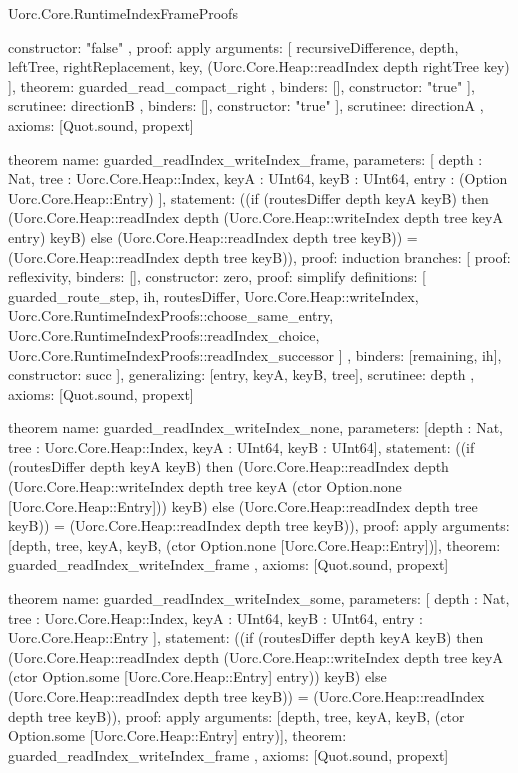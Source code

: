 \begin{lexlean}{Uorc.Core.RuntimeIndexFrameProofs}
\begin{semanticmodule}
{{{{{              constructor: "false"
            },
            {
              proof: apply{
                arguments: [
                  recursiveDifference,
                  depth,
                  leftTree,
                  rightReplacement,
                  key,
                  (Uorc.Core.Heap::readIndex depth rightTree key)
                ],
                theorem: guarded_read_compact_right
              },
              binders: [],
              constructor: "true"
            }
          ],
          scrutinee: directionB
        },
        binders: [],
        constructor: "true"
      }
    ],
    scrutinee: directionA
  },
  axioms: [Quot.sound, propext]
}

theorem{
  name: guarded_readIndex_writeIndex_frame,
  parameters: [
    depth : Nat,
    tree : Uorc.Core.Heap::Index,
    keyA : UInt64,
    keyB : UInt64,
    entry : (Option Uorc.Core.Heap::Entry)
  ],
  statement: ((if (routesDiffer depth keyA keyB) then (Uorc.Core.Heap::readIndex depth (Uorc.Core.Heap::writeIndex depth tree keyA entry) keyB) else (Uorc.Core.Heap::readIndex depth tree keyB)) = (Uorc.Core.Heap::readIndex depth tree keyB)),
  proof: induction{
    branches: [
      {proof: reflexivity{}, binders: [], constructor: zero},
      {
        proof: simplify{
          definitions: [
            guarded_route_step,
            ih,
            routesDiffer,
            Uorc.Core.Heap::writeIndex,
            Uorc.Core.RuntimeIndexProofs::choose_same_entry,
            Uorc.Core.RuntimeIndexProofs::readIndex_choice,
            Uorc.Core.RuntimeIndexProofs::readIndex_successor
          ]
        },
        binders: [remaining, ih],
        constructor: succ
      }
    ],
    generalizing: [entry, keyA, keyB, tree],
    scrutinee: depth
  },
  axioms: [Quot.sound, propext]
}

theorem{
  name: guarded_readIndex_writeIndex_none,
  parameters: [depth : Nat, tree : Uorc.Core.Heap::Index, keyA : UInt64, keyB : UInt64],
  statement: ((if (routesDiffer depth keyA keyB) then (Uorc.Core.Heap::readIndex depth (Uorc.Core.Heap::writeIndex depth tree keyA (ctor Option.none [Uorc.Core.Heap::Entry])) keyB) else (Uorc.Core.Heap::readIndex depth tree keyB)) = (Uorc.Core.Heap::readIndex depth tree keyB)),
  proof: apply{
    arguments: [depth, tree, keyA, keyB, (ctor Option.none [Uorc.Core.Heap::Entry])],
    theorem: guarded_readIndex_writeIndex_frame
  },
  axioms: [Quot.sound, propext]
}

theorem{
  name: guarded_readIndex_writeIndex_some,
  parameters: [
    depth : Nat,
    tree : Uorc.Core.Heap::Index,
    keyA : UInt64,
    keyB : UInt64,
    entry : Uorc.Core.Heap::Entry
  ],
  statement: ((if (routesDiffer depth keyA keyB) then (Uorc.Core.Heap::readIndex depth (Uorc.Core.Heap::writeIndex depth tree keyA (ctor Option.some [Uorc.Core.Heap::Entry] entry)) keyB) else (Uorc.Core.Heap::readIndex depth tree keyB)) = (Uorc.Core.Heap::readIndex depth tree keyB)),
  proof: apply{
    arguments: [depth, tree, keyA, keyB, (ctor Option.some [Uorc.Core.Heap::Entry] entry)],
    theorem: guarded_readIndex_writeIndex_frame
  },
  axioms: [Quot.sound, propext]
}


\end{semanticmodule}
\end{lexlean}
